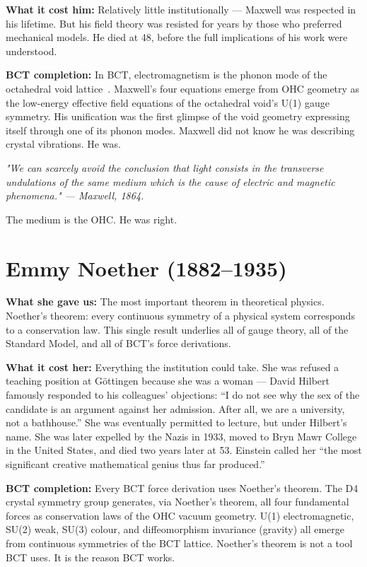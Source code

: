 \documentclass[twocolumn,10pt]{article}
\begin{document}
\textbf{What it cost him:} Relatively little institutionally ---
Maxwell was respected in his lifetime. But his field theory was
resisted for years by those who preferred mechanical models.
He died at 48, before the full implications of his work were
understood.

\textbf{BCT completion:} In BCT, electromagnetism is the phonon
mode of the octahedral void lattice~\cite{bct_l2}. Maxwell's
four equations emerge from OHC geometry as the low-energy
effective field equations of the octahedral void's U(1) gauge
symmetry. His unification was the first glimpse of the void
geometry expressing itself through one of its phonon modes.
Maxwell did not know he was describing crystal vibrations.
He was.

\textit{"We can scarcely avoid the conclusion that light consists
in the transverse undulations of the same medium which is the cause
of electric and magnetic phenomena." --- Maxwell, 1864.}

The medium is the OHC. He was right.

\section{Emmy Noether (1882--1935)}

\textbf{What she gave us:} The most important theorem in
theoretical physics. Noether's theorem: every continuous symmetry
of a physical system corresponds to a conservation law. This
single result underlies all of gauge theory, all of the Standard
Model, and all of BCT's force derivations.

\textbf{What it cost her:} Everything the institution could take.
She was refused a teaching position at G\"{o}ttingen because she
was a woman --- David Hilbert famously responded to his colleagues'
objections: ``I do not see why the sex of the candidate is an
argument against her admission. After all, we are a university,
not a bathhouse.'' She was eventually permitted to lecture, but
under Hilbert's name. She was later expelled by the Nazis in 1933,
moved to Bryn Mawr College in the United States, and died two
years later at 53. Einstein called her ``the most significant
creative mathematical genius thus far produced.''

\textbf{BCT completion:} Every BCT force derivation uses
Noether's theorem. The D4 crystal symmetry group generates,
via Noether's theorem, all four fundamental forces as
conservation laws of the OHC vacuum geometry. U(1) electromagnetic,
SU(2) weak, SU(3) colour, and diffeomorphism invariance (gravity)
all emerge from continuous symmetries of the BCT lattice.
Noether's theorem is not a tool BCT uses. It is the reason BCT works.
\end{document}
